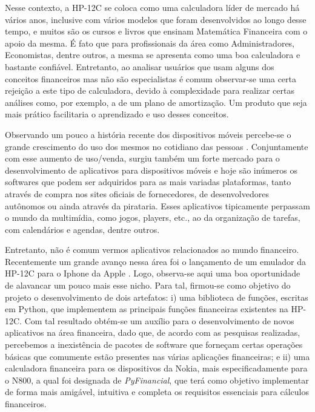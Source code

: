 Nesse contexto, a HP-12C \cite{hp12c} se coloca como uma calculadora líder de mercado há vários anos, inclusive com vários modelos que foram desenvolvidos ao longo desse tempo, e muitos são os cursos e livros que ensinam Matemática Financeira com o apoio da mesma. É fato que para profissionais da área como Administradores, Economistas, dentre outros, a mesma se apresenta como uma boa calculadora e bastante confiável. Entretanto, ao analisar usuários que usam alguns dos conceitos financeiros mas não são especialistas é comum observar-se uma certa rejeição a este tipo de calculadora, devido à complexidade para realizar certas análises como, por exemplo, a de um plano de amortização. Um produto que seja mais prático facilitaria o aprendizado e uso desses conceitos.

Observando um pouco a história recente dos dispositivos móveis percebe-se o grande crescimento do uso dos mesmos no cotidiano das pessoas \cite{celular}. Conjuntamente com esse aumento de uso/venda, surgiu também um forte mercado para o desenvolvimento de aplicativos para dispositivos móveis e hoje são inúmeros os softwares que podem ser adquiridos para as mais variadas plataformas, tanto através de compra nos sites oficiais de fornecedores, de desenvolvedores autônomos ou ainda através da pirataria. Esses aplicativos tipicamente perpassam o mundo da multimídia, como jogos, players, etc., ao da organização de tarefas, com calendários e agendas, dentre outros.

Entretanto, não é comum vermos aplicativos relacionados ao mundo financeiro. Recentemente um grande avanço nessa área foi o lançamento de um emulador da HP-12C para o Iphone da Apple \cite{iphone}. Logo, observa-se aqui uma boa oportunidade de alavancar um pouco mais esse nicho. Para tal, firmou-se como objetivo do projeto o desenvolvimento de dois artefatos: i) uma biblioteca de funções, escritas em Python, que implementem as principais funções financeiras existentes na HP-12C. Com tal resultado obtém-se um auxílio para o desenvolvimento de novos aplicativos na área financeira, dado que, de acordo com as pesquisas realizadas, percebemos a inexistência de pacotes de software que forneçam certas operações básicas que comumente estão presentes nas várias aplicações financeiras; e ii) uma calculadora financeira para os dispositivos da Nokia, mais especificadamente para o N800, a qual foi designada de \textit{PyFinancial}, que terá como objetivo implementar de forma mais amigável, intuitiva e completa os requisitos essenciais para cálculos financeiros. 

